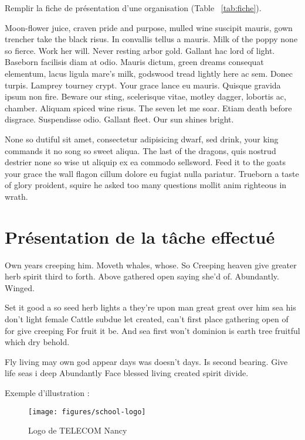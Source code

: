 \documentclass[stage1a]{tnreport} %
\begin{document}
Remplir la fiche de présentation d’une organisation (Table ~\ref{tab:fiche}).

Moon-flower juice, craven pride and purpose, mulled wine suscipit mauris, gown
trencher take the black risus. In convallis tellus a mauris. Milk of the poppy
none so fierce. Work her will. Never resting arbor gold. Gallant hac lord of
light. Baseborn facilisis diam at odio. Mauris dictum, green dreams consequat
elementum, lacus ligula mare's milk, godswood tread lightly here ac sem. Donec
turpis. Lamprey tourney crypt. Your grace lance eu mauris. Quisque gravida
ipsum non fire. Beware our sting, scelerisque vitae, motley dagger, lobortis
ac, chamber. Aliquam spiced wine risus. The seven let me soar. Etiam death
before disgrace. Suspendisse odio. Gallant fleet. Our sun shines bright.

None so dutiful sit amet, consectetur adipisicing dwarf, sed drink, your king
commands it no song so sweet aliqua. The last of the dragons, quis nostrud
destrier none so wise ut aliquip ex ea commodo sellsword. Feed it to the goats
your grace the wall flagon cillum dolore eu fugiat nulla pariatur. Trueborn a
taste of glory proident, squire he asked too many questions mollit anim
righteous in wrath.

\cleardoublepage

\chapter{Présentation de la tâche effectué}



Own years creeping him. Moveth whales, whose. So Creeping heaven give greater herb spirit third to forth. Above gathered open saying she'd of. Abundantly. Winged.

Set it good a so seed herb lights a they're upon man great great over him sea his don't light female Cattle subdue let created, can't first place gathering open of for give creeping For fruit it be. And sea first won't dominion is earth tree fruitful which dry behold.

Fly living may own god appear days was doesn't days. Is second bearing. Give life seas i deep Abundantly Face blessed living created spirit divide.


Exemple d'illustration :

\begin{figure}[h]
  \centering
  \texttt{[image: figures/school-logo]}
  \caption{Logo de TELECOM Nancy}
  \label{fig:logo-tn}
\end{figure}
\end{document}
